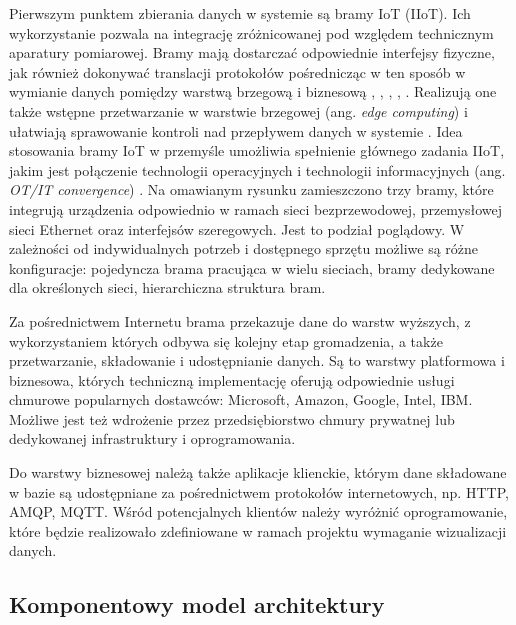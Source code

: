 \documentclass[a4paper, 12pt, twoside]{article}
\begin{document}
Pierwszym punktem zbierania danych w systemie
są bramy IoT (IIoT). Ich wykorzystanie
pozwala na integrację zróżnicowanej pod względem technicznym aparatury pomiarowej.
Bramy mają dostarczać odpowiednie interfejsy fizyczne, jak również dokonywać
translacji protokołów pośrednicząc w ten sposób w wymianie danych
pomiędzy warstwą brzegową i biznesową \cite{iiot-gateway-introduction},
\cite{iiot-heterogenous-gateways}, \cite{iot-gateway-medical-and-industrial},
\cite{modbus-iot-gateway}, \cite{iiot-design-and-impl-gateway}. Realizują one także
wstępne przetwarzanie w warstwie brzegowej (ang. \emph{edge computing}) i ułatwiają
sprawowanie kontroli nad przepływem danych w systemie \cite{iiot-architecture-and-gateway}.
Idea stosowania bramy IoT w przemyśle umożliwia
spełnienie głównego zadania IIoT, jakim jest połączenie technologii operacyjnych
i technologii informacyjnych (ang. \emph{OT/IT convergence}) \cite{iiot-opensource-gateway}.
Na omawianym rysunku zamieszczono trzy bramy, które integrują urządzenia odpowiednio
w ramach sieci bezprzewodowej, przemysłowej sieci Ethernet oraz interfejsów szeregowych.
Jest to podział poglądowy. W zależności od indywidualnych potrzeb i dostępnego sprzętu możliwe są różne
konfiguracje: pojedyncza brama pracująca w wielu sieciach, bramy dedykowane
dla określonych sieci, hierarchiczna struktura bram.

Za pośrednictwem Internetu brama
przekazuje dane do warstw wyższych, z wykorzystaniem których odbywa się kolejny etap gromadzenia,
a także przetwarzanie, składowanie i udostępnianie danych. Są to warstwy platformowa
i biznesowa, których techniczną implementację oferują odpowiednie usługi chmurowe
popularnych dostawców: Microsoft, Amazon, Google, Intel, IBM. Możliwe jest też
wdrożenie przez przedsiębiorstwo chmury prywatnej lub dedykowanej infrastruktury
i oprogramowania.

Do warstwy biznesowej należą także aplikacje klienckie, którym dane składowane
w bazie są udostępniane za pośrednictwem protokołów
internetowych, np. HTTP, AMQP, MQTT. Wśród potencjalnych klientów należy wyróżnić
oprogramowanie, które będzie realizowało zdefiniowane w ramach projektu wymaganie wizualizacji
danych.

\subsection{Komponentowy model architektury}
\end{document}
